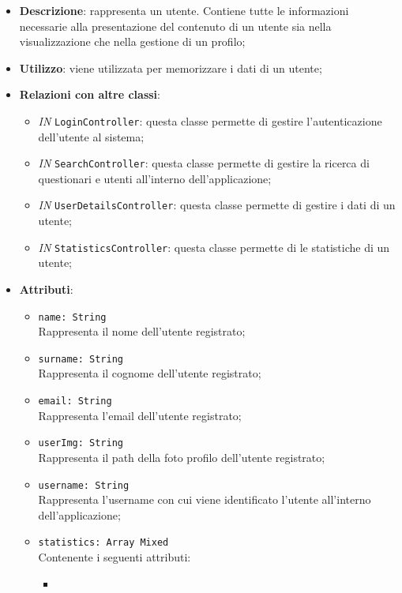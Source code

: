 		\begin{itemize}
			\item \textbf{Descrizione}: rappresenta un utente. Contiene tutte le informazioni necessarie alla
			presentazione del contenuto di un utente sia nella visualizzazione che nella gestione di un profilo;
			\item \textbf{Utilizzo}: viene utilizzata per memorizzare i dati di un utente;
			\item \textbf{Relazioni con altre classi}: 
			\begin{itemize}
				\item \textit{IN} \texttt{LoginController}: questa classe permette di gestire l'autenticazione dell'utente al sistema;
				\item \textit{IN} \texttt{SearchController}: questa classe permette di gestire la ricerca di questionari e utenti all'interno dell'applicazione;
				\item \textit{IN} \texttt{UserDetailsController}: questa classe permette di gestire i dati di un utente;
				\item \textit{IN} \texttt{StatisticsController}: questa classe permette di le statistiche di un utente;
			\end{itemize}
			\item \textbf{Attributi}: 
			\begin{itemize}
				\item 
				\texttt{name: String}\\
				Rappresenta il nome  dell'utente registrato;
				\item 
				\texttt{surname: String}\\
				Rappresenta il cognome  dell'utente registrato;
				\item 
				\texttt{email: String}\\
				Rappresenta l'email  dell'utente registrato;
				\item 
				\texttt{userImg: String}\\
				Rappresenta il path della foto profilo dell'utente registrato;
				\item 
				\texttt{username: String}\\ 
				Rappresenta l'username con cui viene identificato l'utente all'interno dell'applicazione;		  		
				\item
				\texttt{statistics: Array Mixed}\\
				Contenente i seguenti attributi:
				\begin{itemize}
					\item

\end{itemize}
\end{itemize}
\end{itemize}

